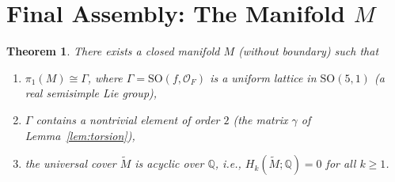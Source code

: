 \documentclass[12pt]{article}
\newtheorem{theorem}{Theorem}
\theoremstyle{definition}
\begin{document}
\section{Final Assembly: The Manifold $M$}\label{sec:final}

\begin{theorem}\label{thm:main}
There exists a closed manifold $M$ (without boundary) such that
\begin{enumerate}[label=(\roman*)]
\item $\pi_1(M)\cong\Gamma$, where $\Gamma=\mathrm{SO}(f,\mathcal{O}_F)$ is a uniform lattice in $\mathrm{SO}(5,1)$ (a real semisimple Lie group),
\item $\Gamma$ contains a nontrivial element of order $2$ (the matrix $\gamma$ of Lemma~\ref{lem:torsion}),
\item the universal cover $\widetilde{M}$ is acyclic over $\mathbb{Q}$, i.e., $H_k(\widetilde{M};\mathbb{Q})=0$ for all $k\geq 1$.
\end{enumerate}
\end{theorem}
\end{document}
